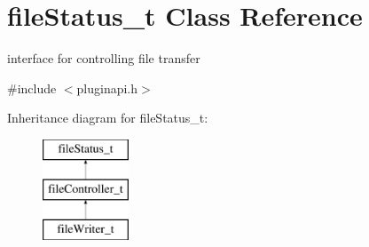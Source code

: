 \hypertarget{classfileStatus__t}{\section{file\-Status\-\_\-t \-Class \-Reference}
\label{classfileStatus__t}
}


interface for controlling file transfer  




{\ttfamily \#include $<$pluginapi.\-h$>$}

\-Inheritance diagram for file\-Status\-\_\-t\-:\begin{figure}[H]
\begin{center}
\leavevmode
\includegraphics[height=3.000000cm]{classfileStatus__t}
\end{center}
\end{figure}
